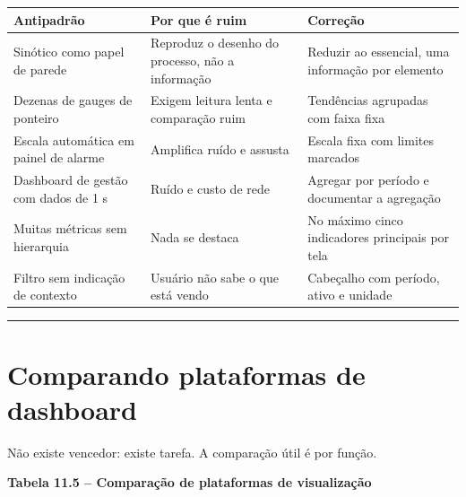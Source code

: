 \begin{longtable}[]{@{}
  >{\raggedright\arraybackslash}p{}
  >{\raggedright\arraybackslash}p{}
  >{\raggedright\arraybackslash}p{}@{}}
\toprule\noalign{}
\begin{minipage}[b]{\linewidth}\raggedright
Antipadrão
\end{minipage} & \begin{minipage}[b]{\linewidth}\raggedright
Por que é ruim
\end{minipage} & \begin{minipage}[b]{\linewidth}\raggedright
Correção
\end{minipage} \\
\midrule\noalign{}
\endhead
\bottomrule\noalign{}
\endlastfoot
Sinótico como papel de parede & Reproduz o desenho do processo, não a informação & Reduzir ao essencial, uma informação por elemento \\
Dezenas de gauges de ponteiro & Exigem leitura lenta e comparação ruim & Tendências agrupadas com faixa fixa \\
Escala automática em painel de alarme & Amplifica ruído e assusta & Escala fixa com limites marcados \\
Dashboard de gestão com dados de 1 s & Ruído e custo de rede & Agregar por período e documentar a agregação \\
Muitas métricas sem hierarquia & Nada se destaca & No máximo cinco indicadores principais por tela \\
Filtro sem indicação de contexto & Usuário não sabe o que está vendo & Cabeçalho com período, ativo e unidade \\
\end{longtable}

\begin{center}\rule{0.5\linewidth}{0.5pt}\end{center}

\section{Comparando plataformas de dashboard}\label{comparando-plataformas-de-dashboard}

Não existe vencedor: existe tarefa. A comparação útil é por função.

\textbf{Tabela 11.5 -- Comparação de plataformas de visualização}

